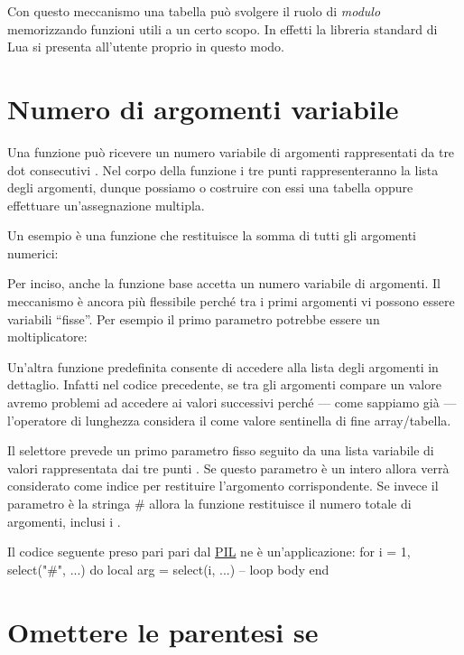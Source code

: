 Con questo meccanismo una tabella può svolgere il ruolo di \emph{modulo}
memorizzando funzioni utili a un certo scopo. In effetti la libreria standard
di Lua si presenta all'utente proprio in questo modo.



\section{Numero di argomenti variabile}

Una funzione può ricevere un numero variabile di argomenti rappresentati da tre
dot consecutivi . Nel corpo della funzione i tre punti
rappresenteranno la lista degli argomenti, dunque possiamo o costruire con essi
una tabella oppure effettuare un'assegnazione multipla.

Un esempio è una funzione che restituisce la somma di tutti gli argomenti
numerici:

Per inciso, anche la funzione base  accetta un numero variabile di
argomenti. Il meccanismo è ancora più flessibile perché tra i primi argomenti
vi possono essere variabili ``fisse''. Per esempio il primo parametro potrebbe
essere un moltiplicatore:

Un'altra funzione predefinita  consente di accedere alla lista degli
argomenti in dettaglio. Infatti nel codice precedente, se tra gli argomenti
compare un valore  avremo problemi ad accedere ai valori successivi
perché --- come sappiamo già --- l'operatore di lunghezza \key{\#} considera il
 come valore sentinella di fine array/tabella.

Il selettore prevede un primo parametro fisso seguito da una lista variabile di
valori rappresentata dai tre punti . Se questo parametro è un intero
allora verrà considerato come indice per restituire l'argomento corrispondente.
Se invece il parametro è la stringa \key\# allora la funzione restituisce il
numero totale di argomenti, inclusi i .

Il codice seguente preso pari pari dal \href{http://www.lua.org/pil/}{PIL} ne è
un'applicazione:
\lines
for i = 1, select("#", ...) do
    local arg = select(i, ...)
    -- loop body
end
\endlines
{}


\section{Omettere le parentesi se}

